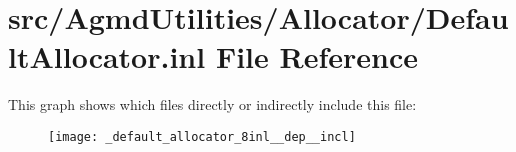 \hypertarget{_default_allocator_8inl}{\section{src/\+Agmd\+Utilities/\+Allocator/\+Default\+Allocator.inl File Reference}
\label{_default_allocator_8inl}
}
This graph shows which files directly or indirectly include this file\+:\nopagebreak
\begin{figure}[H]
\begin{center}
\leavevmode
\texttt{[image: \_default\_allocator\_8inl\_\_dep\_\_incl]}
\end{center}
\end{figure}
